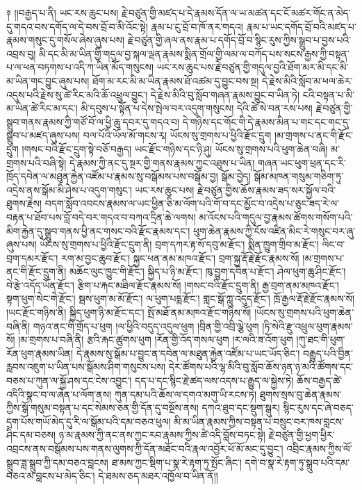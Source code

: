 \documentclass{article}
\begin{document}
༈ །།བརྒྱད་པ་ནི། ཡང་རས་ཆུང་པས། རྗེ་བཙུན་གྱི་མཛད་པ་དེ་རྣམས་དོན་ལ་ཡ་མཚན་དང་ངོ་མཚར་གོང་ན་མེད་དུ་གདའ་བས་དགོད་ལ་དེ་བས་བྲོ་བ་མི་འོང་སྟེ། རྣམ་པ་ངུ་བྲོ་བ་ཁོ་ནར་གདའ། རྣམ་པ་ཡང་དགོད་བྲོ་བའི་མཛད་པ་རྣམས་གསུང་དུ་གསོལ་ཞེས་ཞུས་པས། རྗེ་བཙུན་གྱི་ཞལ་ནས་རྣམ་པ་དགོད་བྲོ་བ་སྙིང་རུས་ཀྱིས་སྒྲུབ་པ་བྱས་པའི་འབྲས་བུ། མི་དང་མི་མ་ཡིན་གྱི་གདུལ་བྱ་སྐལ་ལྡན་རྣམས་སྨིན་གྲོལ་གྱི་ལམ་ལ་བཀོད་པས་སངས་རྒྱས་ཀྱི་བསྟན་པ་ལ་ཕན་བཏགས་པ་འདི་ཀ་ཡིན་མོད་གསུངས། ཡང་རས་ཆུང་པས་རྗེ་བཙུན་གྱི་གདུལ་བྱའི་ཐོག་མར་མི་དང་མི་མ་ཡིན་གང་བྱུང་ཞུས་པས། ཐོག་མ་རང་མི་མ་ཡིན་རྣམས་ཐོ་འཚམ་དུ་བྱུང་བས་སྔ། དེ་རྗེས་མིའི་སློབ་མ་ཕལ་ཆེར་འདུས་པའི་རྗེས་སུ་ཚེ་རིང་མའི་ཆོ་འཕྲུལ་བྱུང་། དེ་རྗེས་མིའི་བུ་སློབ་གཞན་རྣམས་བྱུང་བ་ཡིན་ཏེ། ངའི་བསྟན་པ་མི་མ་ཡིན་ཚེ་རིང་མ་དང་། མི་དབུས་པ་སྟོན་པ་དེས་སྤེལ་བར་འདུག་གསུངས། དེའི་ཚེ་སེ་བན་རས་པས། རྗེ་བཙུན་གྱི་སྒྲུབ་གནས་རྣམས་ཀྱི་གཙོ་བོ་ལ་ཕྱི་ཆུ་དབར་དུ་གདའ་བ། དེ་གཉིས་དང་གོང་གི་དེ་རྣམས་མིན་པ་གང་དང་གང་དུ་སྒྲུབ་པ་མཛད་ཞུས་པས། བལ་པོའི་ཡོལ་མོ་གངས་རྭ། ཡོངས་སུ་གྲགས་པ་ཕྱིའི་རྫོང་དྲུག །མ་གྲགས་པ་ནང་གི་རྫོང་དྲུག །གསང་བའི་རྫོང་དྲུག་སྟེ་བཅོ་བརྒྱད། ཡང་རྫོང་གཉིས་དང་ཉི་ཤུ། ཡོངས་སུ་གྲགས་པའི་ཕུག་ཆེན་བཞི། མ་གྲགས་པའི་བཞི་སྟེ། དེ་རྣམས་ཀྱི་ནང་དུ་སྔར་གྱི་གནས་རྣམས་ཀྱང་འཐུས་པ་ཡིན། གཞན་ཡང་ཕུག་ཕྲན་དང་རི་ཁྲོད་དབེན་ལ་མཐུན་རྐྱེན་འཛོམ་པ་རྣམས་སུ་བསྒོམས་པས་བསྒོམ་བྱ། སྒོམ་བྱེད། སྒོམ་མཁན་གསུམ་གཅིག་ཏུ་འདྲེས་ནས་སྒོམ་མི་ཤེས་པ་འདུག་གསུང་། ཡང་རས་ཆུང་པས། རྗེ་བཙུན་གྱིས་ཆོས་རྣམས་ཟད་སར་སྐྱོལ་བའི་ཐུགས་རྗེས། བདག་སློབ་འབངས་རྣམས་ལ་ཡང་ཕྱིན་ཅི་མ་ལོག་པའི་གོ་བ་དང་མྱོང་བ་འདྲེས་པ་ཅུང་ཟད་རེ་ལ་བརྟན་པ་ཐོབ་པས་བློ་བདེ་བར་གདའ་བ་བཀའ་དྲིན་ཆེ་ལགས། མ་འོངས་པའི་གདུལ་བྱ་རྣམས་ཚོགས་གསོག་པའི་མིག་རྐྱེན་དུ་སྒྲུབ་གནས་ཕྱི་ནང་གསང་བའི་རྫོང་རྣམས་དང་། ཕུག་ཆེན་རྣམས་ཀྱི་ངོས་འཛིན་མིང་རེ་གསུང་བར་ཞུ་ཞུས་པས། ཡོངས་སུ་གྲགས་པ་ཕྱིའི་རྫོང་དྲུག་ནི། བྲག་དཀར་རྟ་སོ་དབུ་མ་རྫོང་། སྨིན་ཁྱུག་གྲིབ་མ་རྫོང་། ལིང་བ་བྲག་དམར་རྫོང་། རག་མ་བྱང་ཆུབ་རྫོང་། སྐྱང་ཕན་ནམ་མཁའ་རྫོང་། བྲག་སྐྱ་རྡོ་རྗེ་རྫོང་རྣམས་སོ། །མ་གྲགས་པ་ནང་གི་རྫོང་དྲུག་ནི། མཆོང་ལུང་ཁྱུང་གི་རྫོང་། སྐྱིད་པ་ཉི་མ་རྫོང་། ཁུ་བྱུག་དབེན་པ་རྫོང་། ཤེལ་ཕུག་ཆུ་ཤིང་རྫོང་། བེ་རྩེ་འདོད་ཡོན་རྫོང་། རྩིག་པ་རྐང་མཐིལ་རྫོང་རྣམས་སོ། །གསང་བའི་རྫོང་དྲུག་ནི། རྒྱ་བྲག་ནམ་མཁའ་རྫོང་། སྟག་ཕུག་སེང་གེ་རྫོང་། སྦས་ཕུག་མ་མོ་རྫོང་། ལ་ཕུག་པདྨ་རྫོང་། གླང་སྒོ་ཀླུ་འདུད་རྫོང་། ཁྲོ་རྒྱལ་རྡོ་རྗེ་རྫོང་རྣམས་སོ། །ཡང་རྫོང་གཉིས་ནི། སྐྱིད་ཕུག་ཉི་མ་རྫོང་དང་། སྤོ་མཐོ་ནམ་མཁའ་རྫོང་གཉིས་སོ། །ཡོངས་སུ་གྲགས་པའི་ཕུག་ཆེན་བཞི་ནི། གཉའ་ནང་གི་གྲོད་པ་ཕུག །ལ་ཕྱིའི་བདུད་འདུལ་ཕུག །བྲིན་གྱི་འབྲི་ལྕེ་ཕུག །ཏི་སེའི་རྫུ་འཕྲུལ་ཕུག་རྣམས་སོ། །མ་གྲགས་པ་བཞི་ནི། རྩའི་རྐང་ཚུགས་ཕུག །རོན་གྱི་འོད་གསལ་ཕུག །ར་ལའི་ཟ་འོག་ཕུག །ཀུ་ཐང་གི་ཕུག་རོན་ཕུག་རྣམས་ཡིན། དེ་རྣམས་སུ་སྒོམ་པ་བྱུང་ན་དབེན་ལ་མཐུན་རྐྱེན་འཛོམ་པ་ཡང་ཡོད་ཅིང་། བརྒྱུད་པའི་བྱིན་རླབས་འཇུག་པ་ཡིན་པས་སྒོམས་ཤིག་གསུངས་པས། དེར་ཚོགས་པའི་ལྷ་མིའི་བུ་སློབ་ཆོས་ཉན་ཉ་མའི་ཚོགས་དང་བཅས་པ་ཀུན་ལ་སྐྱོ་ཤས་དང་ངེས་འབྱུང་། དད་པ་དང་སྙིང་རྗེ་ཚད་ལས་འདས་པ་རྒྱུད་ལ་སྐྱེས་ཏེ། ཆོས་བརྒྱད་ཚེ་འདིའི་སྣང་བ་ལ་ཞེན་པ་ལོག་ནས། ཀུན་དམ་པའི་ཆོས་ལ་དགའ་མགུ་ཡི་རངས་ཏེ། ཐུགས་སྲས་བུ་ཆེན་རྣམས་ཀྱིས་སྒོ་གསུམ་བསྟན་པ་དང་སེམས་ཅན་གྱི་དོན་དུ་བསྔོས་ནས། དཀའ་ཐུབ་དང་སྡུག་སྒུར། སྙིང་རུས་དང་ཞེ་བཅད་དྲག་པོས་གཡོ་མེད་དུ་རི་ལ་སྒོམ་པའི་དམ་བཅའ་ཕུལ། མི་མ་ཡིན་རྣམས་ཀྱིས་བསྟན་པ་བསྲུང་བར་ཁས་བླངས་ཤིང་དམ་བཅས། ཉ་མ་རྣམས་ཀྱི་ནང་ནས་ཀྱང་རབ་རྣམས་ཀྱིས་ཚེ་འདི་བློས་བཏང་སྟེ། རྗེ་བཙུན་གྱི་ཕྱག་ཕྱིར་འབྲངས་ནས་བསྒོམས་པས་གནས་ལུགས་ཀྱི་དོན་མཐོང་བའི་རྣལ་འབྱོར་ཕོ་མོ་མང་དུ་བྱུང་། འབྲིང་རྣམས་ཀྱིས་ལོ་སྒྲུབ་ཟླ་སྒྲུབ་ཀྱི་དམ་བཅའ་བླངས། ཐ་མས་ཀྱང་སྡིག་པ་སྣ་རེ་རྟག་ཏུ་སྤོང་ཞིང་། དགེ་བ་སྣ་རེ་རྟག་ཏུ་སྒྲུབ་པའི་དམ་བཅའ་མ་བླངས་པ་མེད་ཅིང་། དེ་ཐམས་ཅད་མཐར་འཁྱོལ་བ་ཡིན་ནོ།།
\end{document}
